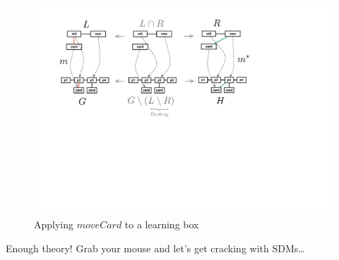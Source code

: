 \pagebreak

\vspace*{2cm}

\begin{figure}[htp] 
\begin{center}
  \includegraphics[width=1\textwidth]{../../org.moflon.doc.handbook.03_storyDiagrams/02_transformationsExplained/teImages/rule_app_example}
  \caption[]{Applying $moveCard$ to a learning box}
  \label{fig:rule_app_example}
\end{center}
\end{figure}

\vspace*{1cm}

Enough theory! Grab your mouse and let's get cracking with SDMs\ldots

